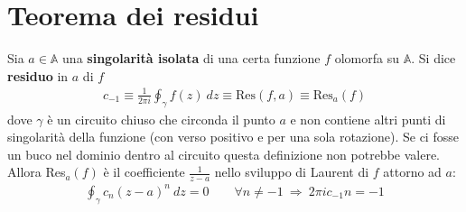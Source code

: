 \documentclass[a4paper, oneside]{article}
\begin{document}
\section{Teorema dei residui}
\begin{definition}[Residuo]
    Sia $a \in \mathbb{A}$ una \textbf{singolarità isolata} di una certa funzione 
    $f$ olomorfa su $\mathbb{A}$. Si dice \textbf{residuo} in $a$ di $f$ 
    \begin{align}
        c_{-1} \equiv \frac{1}{2\pi i}\oint_\gamma f(z) \ dz \equiv \text{Res}(f, a) \equiv \text{Res}_a(f)
    \end{align}
    dove $\gamma$ è un circuito chiuso che circonda il punto $a$ e non contiene 
    altri punti di singolarità della funzione (con verso positivo e per una sola rotazione).
    Se ci fosse un buco nel dominio dentro al circuito questa definizione non potrebbe valere. \\ 
    Allora Res$_a(f)$ è il coefficiente $\frac{1}{z - a}$ nello sviluppo di Laurent di $f$ attorno ad $a$: 
    \begin{align}
        \oint_\gamma c_n(z - a)^{n} \ dz = 0 \qquad \forall n \neq -1  \ \Longrightarrow \ 2\pi i c_{-1}n = -1
    \end{align}
\end{definition}
\end{document}
